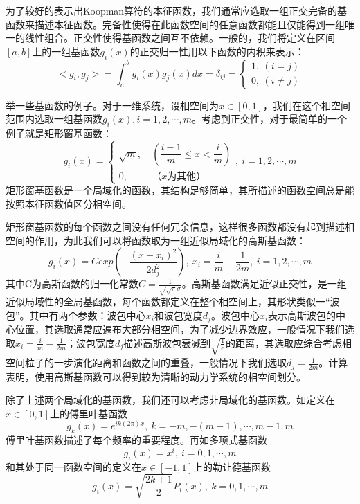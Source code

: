 为了较好的表示出Koopman算符的本征函数，我们通常应选取一组正交完备的基函数来描述本征函数。完备性使得在此函数空间的任意函数都能且仅能得到一组唯一的线性组合。正交性使得基函数之间互不依赖。一般的，我们将定义在区间$[a,b]$上的一组基函数${g_i(x)}$的正交归一性用以下函数的内积来表示：
\begin{equation}
    <g_i,g_j>=\int_a^b{g_i(x)g_j(x)}dx=\delta_{ij}=
    \begin{cases}
        1,\ (i=j)\\
        0,\ (i\neq j)
    \end{cases}
\end{equation}

举一些基函数的例子。对于一维系统，设相空间为$x\in [0,1]$，我们在这个相空间范围内选取一组基函数${g_i(x)},i=1,2,\cdots,m$。考虑到正交性，对于最简单的一个例子就是矩形窗基函数：
\begin{equation}
    g_i(x)=
    \begin{cases}
        \sqrt{m},\ &(\dfrac{i-1}{m}\leqslant x<\dfrac{i}{m})\\
        0,\ &（x为其他）
    \end{cases},\ i=1,2,\cdots,m
\end{equation}
矩形窗基函数是一个局域化的函数，其结构足够简单，其所描述的函数空间总是能按照本征函数值区分相空间。

矩形窗基函数的每个函数之间没有任何冗余信息，这样很多函数都没有起到描述相空间的作用，为此我们可以将函数取为一组近似局域化的高斯基函数：
\begin{equation}
    g_i(x)=Cexp\left(-\dfrac{(x-x_i)^2}{2d_j^2}\right), \ x_i=\frac{i}{m}-\frac{1}{2m},\ i=1,2,\cdots,m
\end{equation}
其中C为高斯函数的归一化常数$C=\frac{1}{\sqrt{\sqrt{\pi}\sigma}}$。高斯基函数满足近似正交性，是一组近似局域性的全局基函数，每个函数都定义在整个相空间上，其形状类似一“波包”。其中有两个参数：波包中心$x_i$和波包宽度$d_j$。波包中心$x_i$表示高斯波包的中心位置，其选取通常应遍布大部分相空间，为了减少边界效应，一般情况下我们选取$x_i=\frac{i}{m}-\frac{1}{2m}$；波包宽度$d_j$描述高斯波包衰减到$\sqrt{\frac{1}{e}}$的距离，其选取应综合考虑相空间粒子的一步演化距离和函数之间的重叠，一般情况下我们选取$d_j=\frac{1}{2m}$。计算表明，使用高斯基函数可以得到较为清晰的动力学系统的相空间划分。

除了上述两个局域化的基函数，我们还可以考虑非局域化的基函数。如定义在$x\in [0,1]$上的傅里叶基函数
\begin{equation}
    g_k(x)=e^{ik(2\pi)x},\ k=-m,-(m-1),\cdots,m-1,m
\end{equation}
傅里叶基函数描述了每个频率的重要程度。再如多项式基函数
\begin{equation}
    g_i(x)=x^i,\ i=0,1,\cdots,m
\end{equation}
和其处于同一函数空间的定义在$x\in [-1,1]$上的勒让德基函数
\begin{equation}
    g_i(x)=\sqrt{\dfrac{2k+1}{2}}P_i(x),\ k=0,1,\cdots,m
\end{equation}

